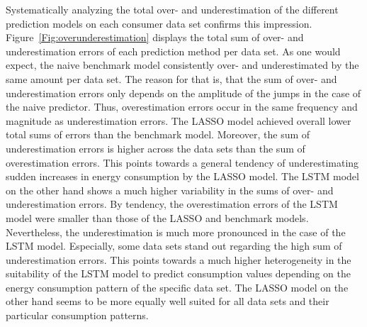 Systematically analyzing the total over- and underestimation of the different prediction models on each consumer data set confirms this impression. Figure~\ref{Fig:overunderestimation} displays the total sum of over- and underestimation errors of each prediction method per data set. As one would expect, the naive benchmark model consistently over- and underestimated by the same amount per data set. The reason for that is, that the sum of over- and underestimation errors only depends on the amplitude of the jumps in the case of the naive predictor. Thus, overestimation errors occur in the same frequency and magnitude as underestimation errors. The LASSO model achieved overall lower total sums of errors than the benchmark model. Moreover, the sum of underestimation errors is higher across the data sets than the sum of overestimation errors. This points towards a general tendency of underestimating sudden increases in energy consumption by the LASSO model. The LSTM model on the other hand shows a much higher variability in the sums of over- and underestimation errors. By tendency, the overestimation errors of the LSTM model were smaller than those of the LASSO and benchmark models. Nevertheless, the underestimation is much more pronounced in the case of the LSTM model. Especially, some data sets stand out regarding the high sum of underestimation errors. This points towards a much higher heterogeneity in the suitability of the LSTM model to predict consumption values depending on the energy consumption pattern of the specific data set. The LASSO model on the other hand seems to be more equally well suited for all data sets and their particular consumption patterns.
%
